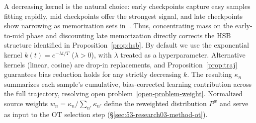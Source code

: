 \begin{foldable}
  A decreasing kernel is the natural choice: early checkpoints capture easy samples fitting rapidly, mid checkpoints offer the strongest signal, and late checkpoints show narrowing as memorization sets in~\cite{arpit2017closer}.
  Thus, concentrating mass on the early-to-mid phase and discounting late memorization directly corrects the \ac{HSB} structure identified in Proposition~\ref{prop:hsb}.
  By default we use the exponential kernel $k(t) = e^{-\lambda t / T}$ ($\lambda > 0$), with $\lambda$ treated as a hyperparameter.
  Alternative kernels (linear, cosine) are drop-in replacements, and Proposition~\ref{prop:traj} guarantees bias reduction holds for any strictly decreasing $k$.
  The resulting $\kappa_n$ summarizes each sample's cumulative, bias-corrected learning contribution across the full trajectory, resolving open problem~\ref{open-problem-weight}.
  Normalized source weights $w_n = \kappa_n / \sum_{n'} \kappa_{n'}$ define the reweighted distribution $P^w$ and serve as input to the \ac{OT} selection step (\S\ref{sec:53-research03-method-ot}).
\end{foldable}

